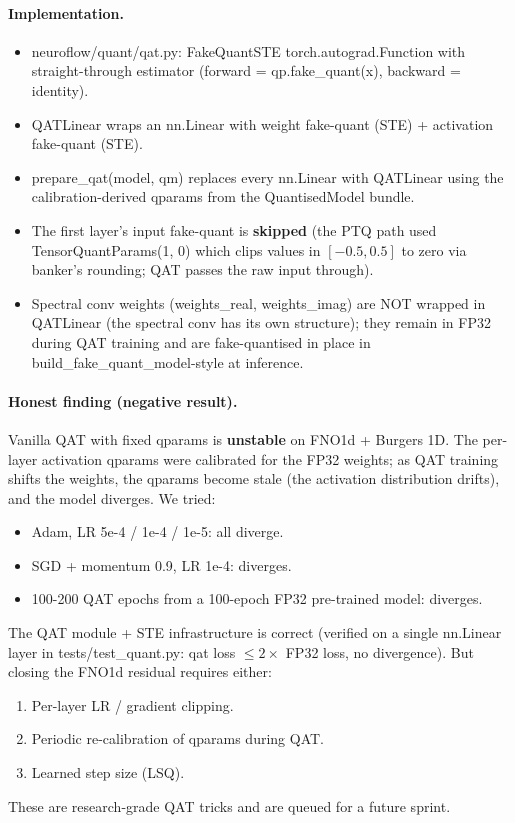 \documentclass[10pt,twocolumn]{article}
\renewcommand{\texttt}[1]{{\normalfont\ttfamily #1}\normalfont\rmfamily}
\begin{document}
\paragraph{Implementation.}
\begin{itemize}
\item \texttt{neuroflow/quant/qat.py}:
  \texttt{FakeQuantSTE} \texttt{torch.autograd.Function}
  with straight-through estimator (forward =
  \texttt{qp.fake\_quant(x)}, backward = identity).
\item \texttt{QATLinear} wraps an \texttt{nn.Linear}
  with weight fake-quant (STE) + activation
  fake-quant (STE).
\item \texttt{prepare\_qat(model, qm)} replaces every
  \texttt{nn.Linear} with \texttt{QATLinear} using
  the calibration-derived qparams from the
  \texttt{QuantisedModel} bundle.
\item The first layer's input fake-quant is
  \textbf{skipped} (the PTQ path used
  \texttt{TensorQuantParams(1, 0)} which clips
  values in $[-0.5, 0.5]$ to zero via banker's
  rounding; QAT passes the raw input through).
\item Spectral conv weights (\texttt{weights\_real},
  \texttt{weights\_imag}) are NOT wrapped in
  \texttt{QATLinear} (the spectral conv has its
  own structure); they remain in FP32 during QAT
  training and are fake-quantised in place in
  \texttt{build\_fake\_quant\_model}-style at
  inference.
\end{itemize}

\paragraph{Honest finding (negative result).}
Vanilla QAT with fixed qparams is \textbf{unstable}
on FNO1d + Burgers 1D.  The per-layer activation
qparams were calibrated for the FP32 weights; as
QAT training shifts the weights, the qparams
become stale (the activation distribution drifts),
and the model diverges.  We tried:
\begin{itemize}
\item Adam, LR 5e-4 / 1e-4 / 1e-5: all diverge.
\item SGD + momentum 0.9, LR 1e-4: diverges.
\item 100-200 QAT epochs from a 100-epoch FP32
pre-trained model: diverges.
\end{itemize}

The QAT module + STE infrastructure is correct
(verified on a single \texttt{nn.Linear} layer in
\texttt{tests/test\_quant.py}: \texttt{qat} loss
$\leq 2 \times$ FP32 loss, no divergence).  But
closing the FNO1d residual requires either:
\begin{enumerate}
\item Per-layer LR / gradient clipping.
\item Periodic re-calibration of qparams during QAT.
\item Learned step size (LSQ).
\end{enumerate}
These are research-grade QAT tricks and are queued
for a future sprint.
\end{document}
